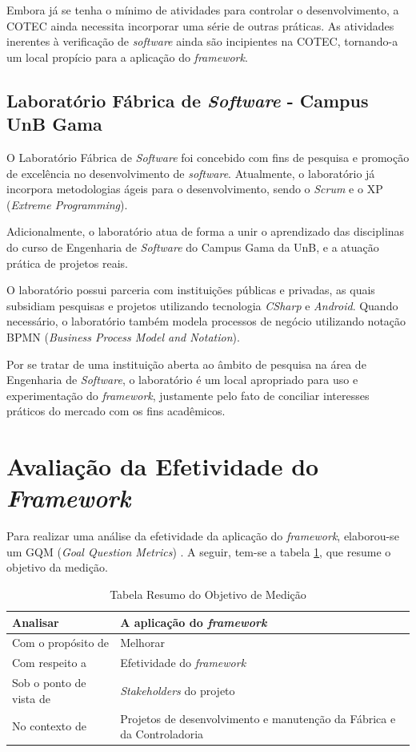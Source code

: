 Embora já se tenha o mínimo de atividades para controlar o desenvolvimento, a COTEC ainda necessita incorporar uma série de outras práticas. As atividades inerentes à verificação de \textit{software} ainda são incipientes na COTEC, tornando-a um local propício para a aplicação do \textit{framework}.

\subsection{Laboratório Fábrica de \textit{Software} - Campus UnB Gama}

O Laboratório Fábrica de \textit{Software} foi concebido com fins de pesquisa e promoção de excelência no desenvolvimento de \textit{software}. Atualmente, o laboratório já incorpora metodologias ágeis para o desenvolvimento, sendo o \textit{Scrum} e o XP (\textit{Extreme Programming}).

Adicionalmente, o laboratório atua de forma a unir o aprendizado das disciplinas do curso de Engenharia de \textit{Software} do Campus Gama da UnB, e a atuação prática de projetos reais.

O laboratório possui parceria com instituições públicas e privadas, as quais subsidiam pesquisas e projetos utilizando tecnologia \textit{CSharp} e \textit{Android}. Quando necessário, o laboratório também modela processos de negócio utilizando notação BPMN (\textit{Business Process Model and Notation}).

Por se tratar de uma instituição aberta ao âmbito de pesquisa na área de Engenharia de \textit{Software}, o laboratório é um local apropriado para uso e experimentação do \textit{framework}, justamente pelo fato de conciliar interesses práticos do mercado com os fins acadêmicos.

\section{Avaliação da Efetividade do \textit{Framework}}

Para realizar uma análise da efetividade da aplicação do \textit{framework}, elaborou-se um GQM (\textit{Goal Question Metrics}) \cite{gqm}. A seguir, tem-se a tabela \ref{table:tabela1}, que resume o objetivo da medição.

\begin{table}[h]
\caption{Tabela Resumo do Objetivo de Medição}
\centering
\begin{tabular}{ | m{8cm} | m{8cm} | } 
\hline
Analisar & A aplicação do \textit{framework} \\ 
\hline
Com o propósito de & Melhorar \\ 
\hline
Com respeito a & Efetividade do \textit{framework} \\ 
\hline
Sob o ponto de vista de & \textit{Stakeholders} do projeto \\ 
\hline
No contexto de & Projetos de desenvolvimento e manutenção da Fábrica e da Controladoria \\ 
\hline
\end{tabular}
\label{table:tabela1}
\end{table}

